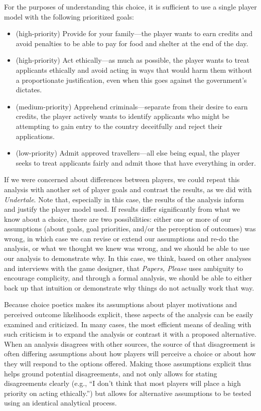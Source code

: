 \documentclass[arts,article,accept,moreauthors,pdftex,10pt,a4paper]{Definitions/mdpi}
\begin{document}
For the purposes of understanding this choice, it is sufficient to use a single player model with the following prioritized goals:
\begin{itemize}
  \item (high-priority) Provide for your family---the player wants to earn credits and avoid penalties to be able to pay for food and shelter at the end of the day.
  \item (high-priority) Act ethically---as much as possible, the player wants to treat applicants ethically and avoid acting in ways that would harm them without a proportionate justification, even when this goes against the government's dictates.
  \item (medium-priority) Apprehend criminals---separate from their desire to earn credits, the player actively wants to identify applicants who might be attempting to gain entry to the country deceitfully and reject their applications.
  \item (low-priority) Admit approved travellers---all else being equal, the player seeks to treat applicants fairly and admit those that have everything in order.
\end{itemize}
If we were concerned about differences between players, we could repeat this analysis with another set of player goals and contrast the results, as we did with \emph{Undertale}.
%
Note that, especially in this case, the results of the analysis inform and justify the player model used.
%
If results differ significantly from what we know about a choice, there are two possibilities: either one or more of our assumptions (about goals, goal priorities, and/or the perception of outcomes) was wrong, in which case we can revise or extend our assumptions and re-do the analysis, or what we thought we knew was wrong, and we should be able to use our analysis to demonstrate why.
%
In this case, we think, based on other analyses and interviews with the game designer, that \emph{Papers, Please} uses ambiguity to encourage complicity, and through a formal analysis, we should be able to either back up that intuition or demonstrate why things do not actually work that way.


Because choice poetics makes its assumptions about player motivations and perceived outcome likelihoods explicit, these aspects of the analysis can be easily examined and criticized.
%
In many cases, the most efficient means of dealing with such criticism is to expand the analysis or contrast it with a proposed alternative.
%
When an analysis disagrees with other sources, the source of that disagreement is often differing assumptions about how players will perceive a choice or about how they will respond to the options offered.
%
Making those assumptions explicit thus helps ground potential disagreements, and not only allows for stating disagreements clearly (e.g., ``I don't think that most players will place a high priority on acting ethically.'') but allows for alternative assumptions to be tested using an identical analytical process.
\end{document}
